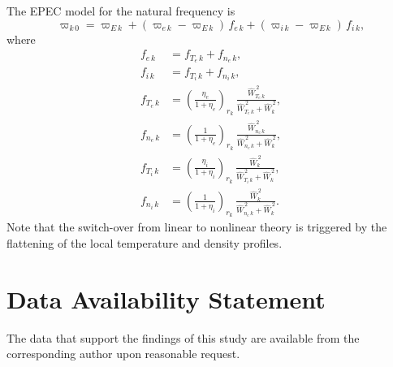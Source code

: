 \documentclass[12pt,prb,aps]{revtex4-1}
\begin{document}
The EPEC model for the natural frequency is
\begin{equation}\label{ecomp}
\varpi_{k\,0} = \varpi_{E\,k} + (\varpi_{e\,k} - \varpi_{E\,k})\,f_{e\,k} + (\varpi_{i\,k} - \varpi_{E\,k})\,f_{i\,k},
\end{equation}
where
\begin{align}
f_{e\,k}&= f_{T_e\,k}+ f_{n_e\,k},\\[0.5ex]
f_{i\,k}&= f_{T_i\,k}+ f_{n_i\,k},\\[0.5ex]
f_{T_e\,k}&=\left(\frac{\eta_e}{1+\eta_e}\right)_{r_k}\,\frac{\hat{W}_{T_e\,k}^{\,2}}{\hat{W}_{T_e\,k}^{\,2}+\hat{W}_k^{\,2}},\\[0.5ex]
f_{n_e\,k}&=\left(\frac{1}{1+\eta_e}\right)_{r_k}\,\frac{\hat{W}_{n_e\,k}^{\,2}}{\hat{W}_{n_e\,k}^{\,2}+\hat{W}_k^{\,2}},\\[0.5ex]
f_{T_i\,k}&=\left(\frac{\eta_i}{1+\eta_i}\right)_{r_k}\,\frac{\hat{W}_k^{\,2}}{\hat{W}_{T_i\,k}^{\,2}+\hat{W}_k^{\,2}},\\[0.5ex]
f_{n_i\,k}&=\left(\frac{1}{1+\eta_i}\right)_{r_k}\,\frac{\hat{W}_k^{\,2}}{\hat{W}_{n_e\,k}^{\,2}+\hat{W}_k^{\,2}}.
\end{align}
Note that the switch-over from linear to nonlinear theory is triggered by the flattening of the local temperature
and density profiles. 


\section*{Data Availability Statement}
The data that support the findings of this study are available from the corresponding author upon reasonable request.
\end{document}

